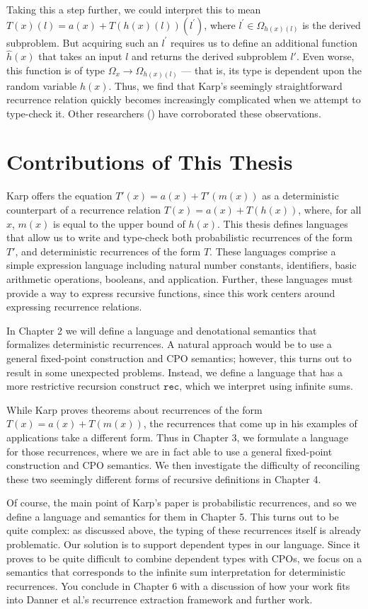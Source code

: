 Taking this a step further, we could interpret this to mean $T(x)(l) = a(x) + T(h(x)(l))(l^\prime)$, where $l^\prime \in 
\Omega_{h(x)(l)}$ is the derived subproblem. But acquiring such an $l^\prime$ requires us to define an 
additional function $\hat{h}(x)$ that takes an input $l$ and returns the derived subproblem $l'$. 
Even worse, this function is of type $\Omega_x \rightarrow \Omega_{h(x)(l)}$ --- that is, its type is dependent 
upon the random variable $h(x)$. Thus, we find that Karp's seemingly straightforward recurrence relation quickly becomes 
increasingly complicated when we attempt to type-check it. Other researchers (\cite{Tassarotti:2017aa}) have corroborated 
these observations. 


\section{Contributions of This Thesis}

Karp offers the equation $T'(x) = a(x) + T'(m(x))$ as a deterministic counterpart of a recurrence relation $T(x) = a(x) + 
T(h(x))$, where, for all $x$, $m(x)$ is equal to the upper bound of $h(x)$. This thesis defines languages that allow
us to write and type-check both probabilistic recurrences of the form $T'$, and deterministic recurrences
of the form $T$. These languages comprise a simple expression language including natural number constants, identifiers, basic arithmetic operations, booleans, and application. Further, these languages must provide
a way to express recursive functions, since this work centers around expressing recurrence relations. 
 
In Chapter 2 we will define a language and denotational semantics that formalizes deterministic recurrences.  A natural 
approach would be to use a general fixed-point construction and CPO semantics; however, this turns out to result in some 
unexpected problems. Instead, we define a language that has a more restrictive recursion construct $\texttt{rec}$, which 
we interpret using infinite sums.  

While Karp proves theorems about recurrences of the form $T(x) = a(x) + T(m(x))$, the recurrences that come up in his 
examples of applications take a different form. Thus in Chapter 3, we formulate a language for those recurrences, where 
we are in fact able to use a general fixed-point construction and CPO semantics.  We then investigate the difficulty of 
reconciling these two seemingly different forms of recursive definitions in Chapter 4. 

 Of course, the main point of Karp's paper is probabilistic recurrences, and so we define a language and semantics for 
 them in Chapter 5.  This turns out to be quite complex: as discussed above, the typing of these recurrences itself is 
 already problematic. Our solution is to support dependent types in our language. Since it proves to be quite difficult to 
 combine dependent types with CPOs, we focus on a semantics that corresponds to the infinite sum interpretation for
 deterministic recurrences.  You conclude in Chapter 6 with a discussion of how your work fits into Danner et al.'s 
 recurrence extraction framework and further work.
 

